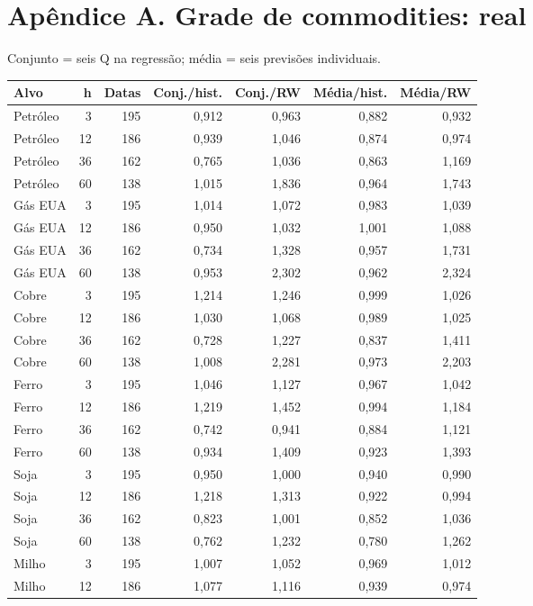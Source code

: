 \documentclass[11pt,a4paper]{article}
\begin{document}
\section*{Apêndice A. Grade de commodities: real}Conjunto = seis Q na regressão; média = seis previsões individuais.\par \footnotesize\begin{center}\begin{tabular}{lrrrrrr}\toprule
Alvo & h & Datas & Conj./hist. & Conj./RW & Média/hist. & Média/RW \\ \midrule
Petróleo & 3 & 195 & 0,912 & 0,963 & 0,882 & 0,932 \\
Petróleo & 12 & 186 & 0,939 & 1,046 & 0,874 & 0,974 \\
Petróleo & 36 & 162 & 0,765 & 1,036 & 0,863 & 1,169 \\
Petróleo & 60 & 138 & 1,015 & 1,836 & 0,964 & 1,743 \\
Gás EUA & 3 & 195 & 1,014 & 1,072 & 0,983 & 1,039 \\
Gás EUA & 12 & 186 & 0,950 & 1,032 & 1,001 & 1,088 \\
Gás EUA & 36 & 162 & 0,734 & 1,328 & 0,957 & 1,731 \\
Gás EUA & 60 & 138 & 0,953 & 2,302 & 0,962 & 2,324 \\
Cobre & 3 & 195 & 1,214 & 1,246 & 0,999 & 1,026 \\
Cobre & 12 & 186 & 1,030 & 1,068 & 0,989 & 1,025 \\
Cobre & 36 & 162 & 0,728 & 1,227 & 0,837 & 1,411 \\
Cobre & 60 & 138 & 1,008 & 2,281 & 0,973 & 2,203 \\
Ferro & 3 & 195 & 1,046 & 1,127 & 0,967 & 1,042 \\
Ferro & 12 & 186 & 1,219 & 1,452 & 0,994 & 1,184 \\
Ferro & 36 & 162 & 0,742 & 0,941 & 0,884 & 1,121 \\
Ferro & 60 & 138 & 0,934 & 1,409 & 0,923 & 1,393 \\
Soja & 3 & 195 & 0,950 & 1,000 & 0,940 & 0,990 \\
Soja & 12 & 186 & 1,218 & 1,313 & 0,922 & 0,994 \\
Soja & 36 & 162 & 0,823 & 1,001 & 0,852 & 1,036 \\
Soja & 60 & 138 & 0,762 & 1,232 & 0,780 & 1,262 \\
Milho & 3 & 195 & 1,007 & 1,052 & 0,969 & 1,012 \\
Milho & 12 & 186 & 1,077 & 1,116 & 0,939 & 0,974 \\

\end{tabular}
\end{center}
\end{document}

